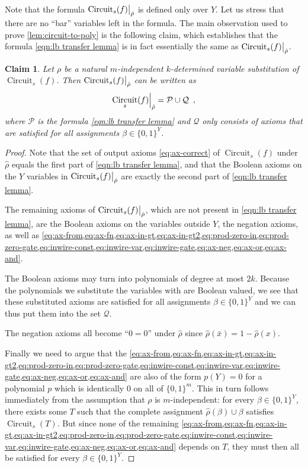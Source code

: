 \documentclass[10pt,a4paper]{article}
\theoremstyle{plain}
\newtheorem{claim}[theorem]{Claim}
\theoremstyle{remark}
\theoremstyle{definition}
\newcommand{\eqcomma}{\enspace ,}
\newcommand{\set}[1]{\{#1\}}
\newcommand\restrict[2]{{%
  \left.\kern-\nulldelimiterspace %
  #1 %
  \vphantom{\big|} %
  \right|_{#2} %
  }}
\newcommand{\calP}{\mathcal{P}}
\newcommand{\calQ}{\mathcal{Q}}
\DeclareMathOperator{\circuit}{Circuit}
\begin{document}
Note that the formula $\restrict{\circuit_s(f)}{\hat\rho}$ is
defined only over $Y$. Let us stress that there are no ``bar''
variables left in the formula. The main observation used to prove
\cref{lem:circuit-to-poly} is the following claim, which establishes
that the formula \eqref{eqn:lb transfer lemma} is in fact essentially
the same as $\restrict{\circuit_s(f)}{\hat\rho}$.

\begin{claim}
  \label{claim:tau-rho}
  Let $\rho$ be a natural $m$-independent $k$-determined variable substitution
  of $\circuit_s(f)$.  Then
  $\restrict{\circuit_s(f)}{\hat\rho}$ can be written as
  $$
  \restrict{\circuit_s(f)}{\hat\rho} = \calP \cup \calQ \eqcomma
  $$
  where $\calP$ is the formula \eqref{eqn:lb transfer lemma} and
  $\calQ$ only consists of axioms that are satisfied for all
  assignments $\beta \in \{0,1\}^Y$.
\end{claim}

\begin{proof}
  Note that the set of output axioms \eqref{eq:ax-correct} of
  $\circuit_s(f)$ under $\hat\rho$ equals the first part of
  \eqref{eqn:lb transfer lemma}, and that the Boolean axioms on the $Y$ variables in
  $\restrict{\circuit_s(f)}{\hat\rho}$ are exactly the second part
  of \eqref{eqn:lb transfer lemma}.

  The remaining axioms of $\restrict{\circuit_s(f)}{\hat\rho}$, which
  are not present in \eqref{eqn:lb transfer lemma}, are the Boolean
  axioms on the variables outside $Y$, the negation axioms, as well as
  \cref{eq:ax-from,eq:ax-fn,eq:ax-in-gt,eq:ax-in-gt2,eq:prod-zero-in,eq:prod-zero-gate,eq:inwire-const,eq:inwire-var,eq:inwire-gate,eq:ax-neg,eq:ax-or,eq:ax-and}.

  The Boolean axioms may turn into polynomials of degree at most
  $2k$. Because the polynomials we substitute the variables with are
  Boolean valued, we see that these substituted axioms are satisfied
  for all assignments $\beta \in \set{0,1}^Y$ and we can thus put them
  into the set $\calQ$.

  The negation axioms all become ``$0=0$'' under $\hat{\rho}$ since
  $\hat{\rho}(\bar{x}) = 1 - \hat{\rho}(x)$.
  
  Finally we need to argue that the
  \cref{eq:ax-from,eq:ax-fn,eq:ax-in-gt,eq:ax-in-gt2,eq:prod-zero-in,eq:prod-zero-gate,eq:inwire-const,eq:inwire-var,eq:inwire-gate,eq:ax-neg,eq:ax-or,eq:ax-and}
  are also of the form $p(Y)=0$ for a polynomial $p$ which is
  identically $0$ on all of $\{0,1\}^m$.  This in turn follows
  immediately from the assumption that $\rho$ is $m$-independent: for
  every $\beta \in \{0,1\}^Y$, there exists some $T$ such that the
  complete assignment $\hat\rho(\beta) \cup \beta$ satisfies
  $\circuit_s(T)$.  But since none of the remaining
  \cref{eq:ax-from,eq:ax-fn,eq:ax-in-gt,eq:ax-in-gt2,eq:prod-zero-in,eq:prod-zero-gate,eq:inwire-const,eq:inwire-var,eq:inwire-gate,eq:ax-neg,eq:ax-or,eq:ax-and}
  depends on $T$, they must then all be satisfied for every
  $\beta \in \{0,1\}^Y$.
\end{proof}
\end{document}
